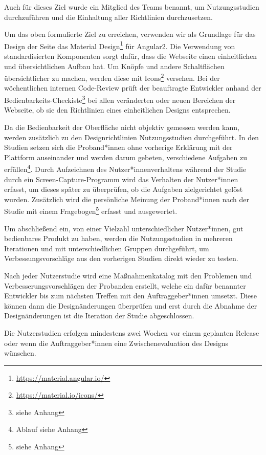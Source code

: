 Auch für dieses Ziel wurde ein Mitglied des Teams benannt, um Nutzungsstudien durchzuführen und die Einhaltung aller Richtlinien durchzusetzen.

Um das oben formulierte Ziel zu erreichen, verwenden wir als Grundlage für das Design der Seite das Material Design\footnote{\href{https://material.angular.io/}{https://material.angular.io/}} für Angular2. Die Verwendung von standardisierten Komponenten sorgt dafür, dass die Webseite einen einheitlichen und übersichtlichen Aufbau hat. Um Knöpfe und andere Schaltflächen übersichtlicher zu machen, werden diese mit Icons\footnote{\href{https://material.io/icons/}{https://material.io/icons/}} versehen. Bei der wöchentlichen internen Code-Review prüft der beauftragte Entwickler anhand der Bedienbarkeits-Checkiste\footnote{siehe Anhang} bei allen veränderten oder neuen Bereichen der Webseite, ob sie den Richtlinien eines einheitlichen Designs entsprechen.

Da die Bedienbarkeit der Oberfläche nicht objektiv gemessen werden kann, werden zusätzlich zu den Designrichtlinien Nutzungsstudien durchgeführt. In den Studien setzen sich die Proband*innen ohne vorherige Erklärung mit der Plattform auseinander und werden darum gebeten, verschiedene Aufgaben zu erfüllen\footnote{Ablauf siehe Anhang}. Durch Aufzeichnen des Nutzer*innenverhaltens während der Studie durch ein Screen-Capture-Programm wird das Verhalten der Nutzer*innen erfasst, um dieses später zu überprüfen, ob die Aufgaben zielgerichtet gelöst wurden. Zusätzlich wird die persönliche Meinung der Proband*innen nach der Studie mit einem Fragebogen\footnote{siehe Anhang} erfasst und ausgewertet.

Um abschließend ein, von einer Vielzahl unterschiedlicher Nutzer*innen, gut bedienbares Produkt zu haben, werden die Nutzungsstudien in mehreren Iterationen und mit unterschiedlichen Gruppen durchgeführt, um Verbessungsvorschläge aus den vorherigen Studien direkt wieder zu testen. 

Nach jeder Nutzerstudie wird eine Maßnahmenkatalog mit den Problemen und Verbesserungsvorschlägen der Probanden erstellt, welche ein dafür benannter Entwickler bis zum nächsten Treffen mit den Auftraggeber*innen umsetzt. Diese können dann die Designänderungen überprüfen und erst durch die Abnahme der Designänderungen ist die Iteration der Studie abgeschlossen.

Die Nutzerstudien erfolgen mindestens zwei Wochen vor einem geplanten Release oder wenn die Auftraggeber*innen eine Zwischenevaluation des Designs wünschen.

